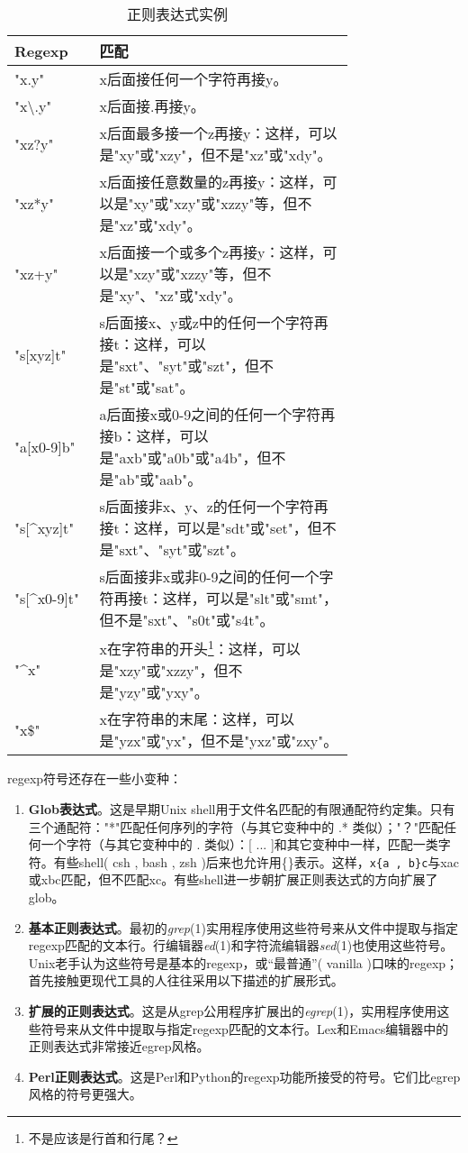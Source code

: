 \documentclass[12pt,oneside]{book}
\begin{document}
\begin{common-format}
\noindent
\begin{minipage}{\linewidth}
\begin{table}[H]
\centering
\caption{正则表达式实例}
\medskip 
\begin{tabular}{@{}lp{0.75\linewidth}@{}}
\toprule
Regexp & 匹配  \\ \midrule
"x.y" & x后面接任何一个字符再接y。 \\
"x\textbackslash{}.y" &	x后面接.再接y。 \\
"xz?y" & x后面最多接一个z再接y：这样，可以是"xy"或"xzy"，但不是"xz"或"xdy"。 \\
"xz*y" & x后面接任意数量的z再接y：这样，可以是"xy"或"xzy"或"xzzy"等，但不是"xz"或"xdy"。 \\
"xz+y" & x后面接一个或多个z再接y：这样，可以是"xzy"或"xzzy"等，但不是"xy"、"xz"或"xdy"。 \\
"s[xyz]t" &  s后面接x、y或z中的任何一个字符再接t：这样，可以是"sxt"、"syt"或"szt"，但不是"st"或"sat"。 \\
"a[x0-9]b" & 	a后面接x或0-9之间的任何一个字符再接b：这样，可以是"axb"或"a0b"或"a4b"，但不是"ab"或"aab"。 \\
"s[\^{}xyz]t" & s后面接非x、y、z的任何一个字符再接t：这样，可以是"sdt"或"set"，但不是"sxt"、"syt"或"szt"。\\
"s[\^{}x0-9]t" & s后面接非x或非0-9之间的任何一个字符再接t：这样，可以是"slt"或"smt"，但不是"sxt"、"s0t"或"s4t"。\\
"\^{}x"	& x在字符串的开头\footnote{不是应该是行首和行尾？}：这样，可以是"xzy"或"xzzy"，但不是"yzy"或"yxy"。\\
"x\${}" & x在字符串的末尾：这样，可以是"yzx"或"yx"，但不是"yxz"或"zxy"。  
\\ \bottomrule
\end{tabular}
\end{table}
\end{minipage}

regexp符号还存在一些小变种：
\begin{enumerate}
\item \textbf{Glob表达式}。这是早期Unix shell用于文件名匹配的有限通配符约定集。只有三个通配符："*"匹配任何序列的字符（与其它变种中的 .* 类似）；"？"匹配任何一个字符（与其它变种中的 . 类似）：[ ... ]和其它变种中一样，匹配一类字符。有些shell( csh , bash , zsh )后来也允许用\{\}表示。这样，\verb+x{a , b}c+与xac或xbc匹配，但不匹配xc。有些shell进一步朝扩展正则表达式的方向扩展了glob。
\item \textbf{基本正则表达式}。最初的\textit{grep}(1)实用程序使用这些符号来从文件中提取与指定regexp匹配的文本行。行编辑器\textit{ed}(1)和字符流编辑器\textit{sed}(1)也使用这些符号。Unix老手认为这些符号是基本的regexp，或“最普通”( vanilla )口味的regexp；首先接触更现代工具的人往往采用以下描述的扩展形式。
\item \textbf{扩展的正则表达式}。这是从grep公用程序扩展出的\textit{egrep}(1)，实用程序使用这些符号来从文件中提取与指定regexp匹配的文本行。Lex和Emacs编辑器中的正则表达式非常接近egrep风格。
\item \textbf{Perl正则表达式}。这是Perl和Python的regexp功能所接受的符号。它们比egrep风格的符号更强大。
\end{enumerate}


\end{common-format}
\end{document}
